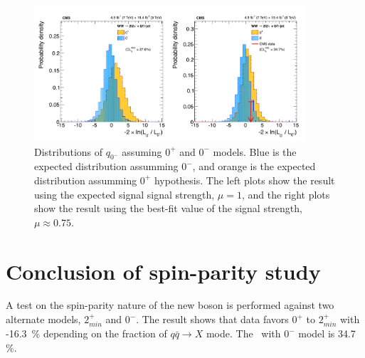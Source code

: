 %
\begin{figure}[ht!] 
\centering 
\includegraphics[width=0.9\textwidth]{figures/spin0mLLR.pdf}
\caption{Distributions of $q_{0^-}$ assuming $0^+$ and $0^-$ models.  
Blue is the expected distribution assumming $0^-$, 
and orange is the expected distribution assumming $0^+$ hypothesis.
The left plots show the result using the expected signal signal strength, $\mu=1$, 
and the right plots show the result using the best-fit value of the signal strength, 
$\mu \approx 0.75$.}  
\label{fig:llr_spin0m} 
\end{figure} 

\section{Conclusion of spin-parity study} 

A test on the spin-parity nature of the new boson is performed against two alternate 
models, $2_{min}^+$ and $0^-$. The result shows that data favors $0^+$ to 
$2_{min}^+$ with -16.3~\% depending on the fraction of 
$q\bar{q}\rightarrow X$ mode. The \CLs\ with $0^-$ model is 34.7 \%.  


